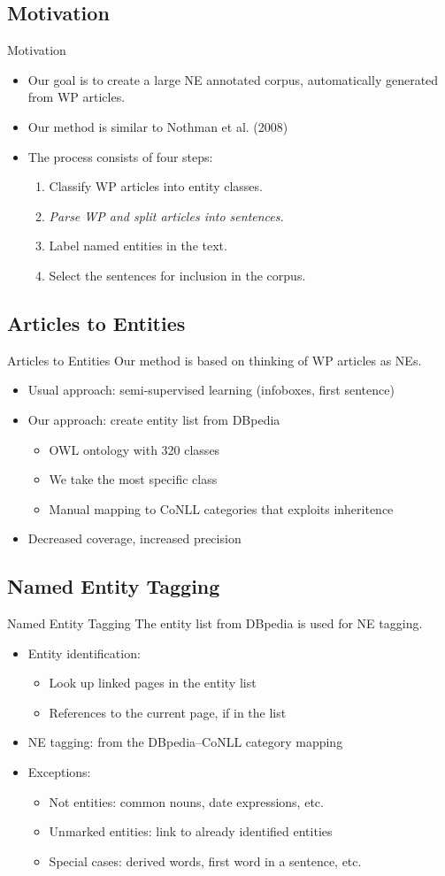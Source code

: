 \documentclass[utf8x,t]{beamer}
\newcommand{\vitem}{\vfill \item}
\begin{document}
\subsection*{Motivation}
\begin{frame}{Motivation}
  \begin{itemize}
  \vitem Our goal is to create a large NE annotated corpus, automatically
        generated from WP articles.
  \vitem Our method is similar to Nothman et al. (2008)
  \vitem The process consists of four steps:
    \begin{enumerate}
    \vitem Classify WP articles into entity classes.
    \vitem \textit{Parse WP and split articles into sentences.}
    \vitem Label named entities in the text.
    \vitem Select the sentences for inclusion in the corpus.
    \end{enumerate}
  \end{itemize}
\end{frame}

\subsection{Articles to Entities}
\begin{frame}{Articles to Entities}
  Our method is based on thinking of WP articles as NEs.
  \begin{itemize}
  \vitem Usual approach: semi-supervised learning (infoboxes, first sentence)
  \vitem Our approach: create entity list from DBpedia
    \begin{itemize}
    \vitem OWL ontology with 320 classes
    \vitem We take the most specific class
    \vitem Manual mapping to CoNLL categories that exploits inheritence
    \end{itemize}
  \vitem Decreased coverage, increased precision
  \end{itemize}
\end{frame}

\subsection{Named Entity Tagging}
\begin{frame}{Named Entity Tagging}
  The entity list from DBpedia is used for NE tagging.
  \begin{itemize}
  \vitem Entity identification:
    \begin{itemize}
    \vitem Look up linked pages in the entity list
    \vitem References to the current page, if in the list
    \end{itemize}
  \vitem NE tagging: from the DBpedia--CoNLL category mapping
  \vitem Exceptions:
    \begin{itemize}
    \vitem Not entities: common nouns, date expressions, etc.
    \vitem Unmarked entities: link to already identified entities
    \vitem Special cases: derived words, first word in a sentence, etc.
    \end{itemize}
  \end{itemize}
\end{frame}
\end{document}
